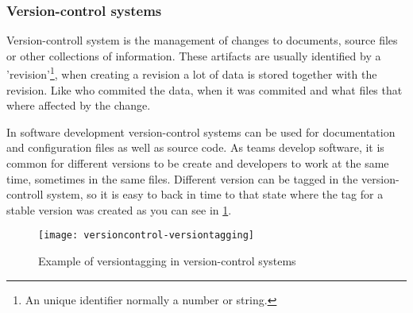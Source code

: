 \subsubsection{Version-control systems}
Version-controll system is the management of changes to documents, source files or other collections of information. These artifacts are usually identified by a 'revision'\footnote{An unique identifier normally a number or string.}, when creating a revision a lot of data is stored together with the revision. Like who commited the data, when it was commited and what files that where affected by the change.

In software development version-control systems can be used for documentation and configuration files as well as source code. As teams develop software, it is common for different versions to be create and developers to work at the same time, sometimes in the same files. Different version can be tagged in the version-controll system, so it is easy to back in time to that state where the tag for a stable version was created as you can see in \ref{versiontagging}.

\begin{figure}[!htpb]
\centering
	\texttt{[image: versioncontrol-versiontagging]}
\caption{Example of versiontagging in version-control systems}
\label{versiontagging}
\end{figure}





